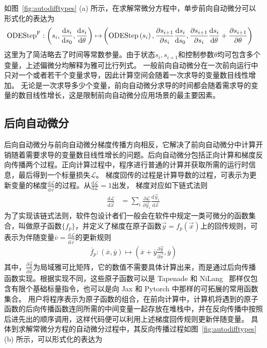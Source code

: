 \documentclass[A4,twoside,UTF8]{ctexart}
\def\D{\mathrm{d}}
\begin{document}
如图~\ref{fig:autodifftypes} (a) 所示，在求解常微分方程中，单步前向自动微分可以形式化的表达为
\begin{align*}
    {\rm ODEStep}^{\rm F} : \left(s_{i}, \frac{\D s_{i}}{\D s_0}, \frac{\D s_{i}}{\D \theta}\right)
        \mapsto &\left({\rm ODEStep}\left(s_{i}\right), \frac{\partial s_{i+1}}{\partial s_i} \frac{\D s_{i}}{\D s_0},
        \frac{\partial s_{i+1}}{\partial s_i} \frac{\D s_{i}}{\D \theta} + \frac{\partial s_{i+1}}{\partial \theta}\right)
\end{align*}
这里为了简洁略去了时间等常数参量。由于状态$s_i, s_{i+1}$和控制参数$\theta$均可包含多个变量，上述偏微分均解释为雅可比行列式。
一般前向自动微分在一次前向运行中只对一个或者若干个变量求导，因此计算空间会随着一次求导的变量数目线性增加。
无论是一次求导多少个变量，前向自动微分求导的时间都会随着需求导的变量的数目线性增长，这是限制前向自动微分应用场景的最主要因素。

\subsection{后向自动微分}
后向自动微分与前向自动微分梯度传播方向相反，它解决了前向自动微分中计算开销随着需要求导的变量数目线性增长的问题。后向自动微分包括正向计算和梯度反向传播两个过程。正向计算过程中，程序进行普通的计算并获取所需的运行时信息，最后得到一个标量损失$\mathcal{L}$。
梯度回传的过程是计算导数的过程，可表示为更新变量的梯度$\frac{\D \mathcal{L}}{\D \vec v}$的过程。从$\frac{\D\mathcal L}{\D\mathcal L} = 1$出发，
梯度对应如下链式法则
\begin{align*}
    \frac{\D \mathcal{L}}{\D \vec x} &= \sum_{i}\frac{\partial \mathcal{L}}{\partial \vec y_i}\frac{\D \vec y_i}{\D \vec x}
\end{align*}
为了实现该链式法则，软件包设计者们一般会在软件中规定一类可微分的函数集合，叫做原子函数$\{f_p\}$，并定义了梯度在原子函数$\vec y=f_p(\vec x)$上的回传规则，可表示为伴随变量$\overline{v} = \frac{\D \mathcal{L}}{\D \vec v}$的更新规则
\begin{align*}
    \overline f_p: (\overline x, \overline y) \mapsto (\overline x + \overline y\frac{\partial \vec y}{\partial \vec x}, \overline y)
\end{align*}
其中，$\frac{\partial \vec y}{\partial \vec x}$为局域雅可比矩阵，它的数值不需要具体计算出来，而是通过后向传播函数实现。根据实现不同，这些原子函数可以是 Tapenade 和 NiLang~\cite{Liu2020b} 那样仅包含有限个基础标量指令，也可以是向 Jax 和 Pytorch 中那样的可拓展的常用函数集合。
用户将程序表示为原子函数的组合，在前向计算中，计算机将遇到的原子函数的后向传播函数连同所需的中间变量一起存放在堆栈中，并在反向传播中按照后进先出的顺序调用，这样代码便可以利用上述梯度回传规则更新伴随变量。
具体到求解常微分方程的自动微分过程中，其反向传播过程如图~\ref{fig:autodifftypes} (b) 所示，可以形式化的表达为
\end{document}

